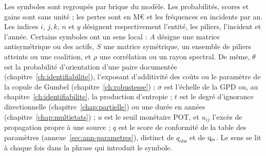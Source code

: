 \noindent Les symboles sont regroupés par brique du modèle. Les probabilités, scores et gains sont
sans unité ; les pertes sont en M\euro{} et les fréquences en incidents par an. Les indices
$i$, $j,k$, $n$ et $y$ désignent respectivement l'entité, les piliers, l'incident et l'année.
Certains symboles ont un sens local : $A$ désigne une matrice antisymétrique ou des actifs,
$S$ une matrice symétrique, un ensemble de piliers atteints ou une coalition, et $\rho$ une
corrélation ou un rayon spectral. De même, $\theta$ est la probabilité d'orientation d'une paire
documentée (chapitre~\ref{ch:identifiabilite}), l'exposant d'additivité des coûts ou le paramètre
de la copule de Gumbel (chapitre~\ref{ch:robustesse}) ; $\sigma$ est l'échelle de la GPD ou, au
chapitre~\ref{ch:identifiabilite}, la production d'entropie ; $t$ est le degré d'ignorance
directionnelle (chapitre~\ref{chap:partielle}) ou une durée en années (chapitre~\ref{chap:multietats}) ;
$u$ est le seuil monétaire POT, et $u_{ij}$ l'excès de propagation propre à une source ; $q$ est le
score de conformité de la table des paramètres (annexe~\ref{sec:ann-parametres}), distinct de $q_{\mathrm{obs}}$ et de $\mathrm{q}_\alpha$. Le sens
se lit à chaque fois dans la phrase qui introduit le symbole.

